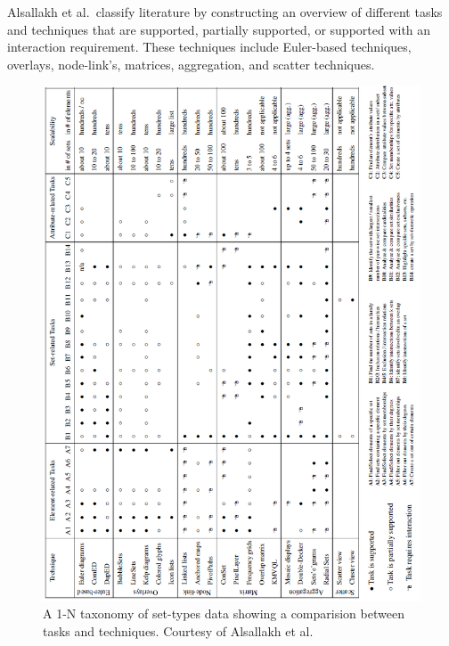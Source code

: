 Alsallakh et al.\ classify literature by constructing an overview of different tasks and techniques that are supported, partially supported, or supported with an interaction requirement. These techniques include Euler-based techniques, overlays, node-link's, matrices, aggregation, and scatter techniques.

\begin{figure}[p]
\begin{center}
\includegraphics[width=1\textwidth]{images/alsallakh2014visualising}
\caption{A 1-N taxonomy of set-types data showing a comparision between tasks and techniques. Courtesy of Alsallakh et al.\ \cite{alsallakh2014visualising}} \label{fig: alsallakh2014visualising}
\end{center}
\end{figure}


